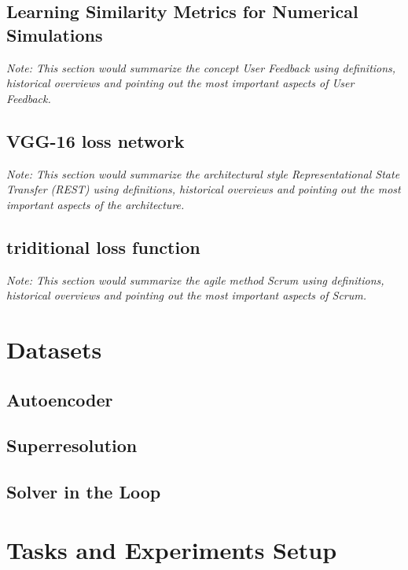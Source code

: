 \documentclass[a4paper,12pt,twoside]{report}
\begin{document}
\section{Learning Similarity Metrics for Numerical Simulations}

\textit{Note: This section would summarize the concept User Feedback using definitions, historical overviews and pointing out the most important aspects of User Feedback.}

\section{VGG-16 loss network}

\textit{Note: This section would summarize the architectural style Representational State Transfer (REST) using definitions, historical overviews and pointing out the most important aspects of the architecture.}

\section{triditional loss function}

\textit{Note: This section would summarize the agile method Scrum using definitions, historical overviews and pointing out the most important aspects of Scrum.}




\chapter{Datasets}

\section{Autoencoder}

\section{Superresolution}

\section{Solver in the Loop}






\chapter{Tasks and Experiments Setup}
\end{document}
